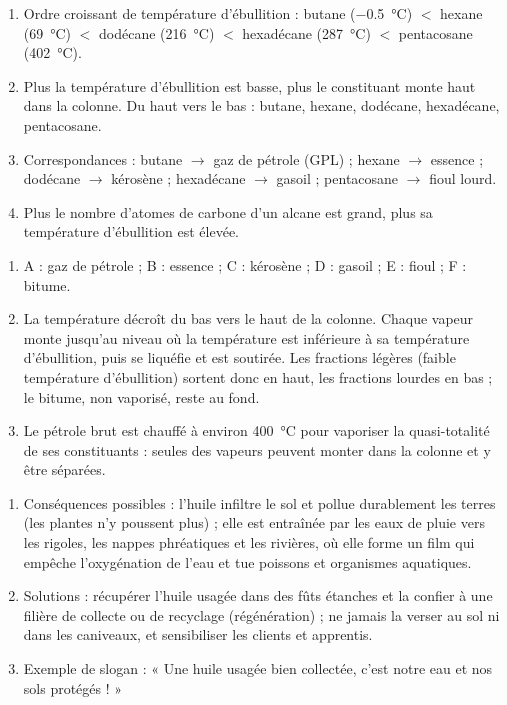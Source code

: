 \documentclass[11pt]{article}
\begin{document}
\begin{corrige}
\begin{enumerate}
\item Ordre croissant de température d'ébullition : butane (\SI{-0.5}{\celsius}) $<$ hexane (\SI{69}{\celsius}) $<$ dodécane (\SI{216}{\celsius}) $<$ hexadécane (\SI{287}{\celsius}) $<$ pentacosane (\SI{402}{\celsius}).
\item Plus la température d'ébullition est basse, plus le constituant monte haut dans la colonne. Du haut vers le bas : butane, hexane, dodécane, hexadécane, pentacosane.
\item Correspondances : butane $\to$ gaz de pétrole (GPL) ; hexane $\to$ essence ; dodécane $\to$ kérosène ; hexadécane $\to$ gasoil ; pentacosane $\to$ fioul lourd.
\item Plus le nombre d'atomes de carbone d'un alcane est grand, plus sa température d'ébullition est élevée.
\end{enumerate}
\end{corrige}

\begin{corrige}
\begin{enumerate}
\item A : gaz de pétrole ; B : essence ; C : kérosène ; D : gasoil ; E : fioul ; F : bitume.
\item La température décroît du bas vers le haut de la colonne. Chaque vapeur monte jusqu'au niveau où la température est inférieure à sa température d'ébullition, puis se liquéfie et est soutirée. Les fractions légères (faible température d'ébullition) sortent donc en haut, les fractions lourdes en bas ; le bitume, non vaporisé, reste au fond.
\item Le pétrole brut est chauffé à environ \SI{400}{\celsius} pour vaporiser la quasi-totalité de ses constituants : seules des vapeurs peuvent monter dans la colonne et y être séparées.
\end{enumerate}
\end{corrige}

\begin{corrige}
\begin{enumerate}
\item Conséquences possibles : l'huile infiltre le sol et pollue durablement les terres (les plantes n'y poussent plus) ; elle est entraînée par les eaux de pluie vers les rigoles, les nappes phréatiques et les rivières, où elle forme un film qui empêche l'oxygénation de l'eau et tue poissons et organismes aquatiques.
\item Solutions : récupérer l'huile usagée dans des fûts étanches et la confier à une filière de collecte ou de recyclage (régénération) ; ne jamais la verser au sol ni dans les caniveaux, et sensibiliser les clients et apprentis.
\item Exemple de slogan : « Une huile usagée bien collectée, c'est notre eau et nos sols protégés ! »
\end{enumerate}
\end{corrige}
\end{document}
